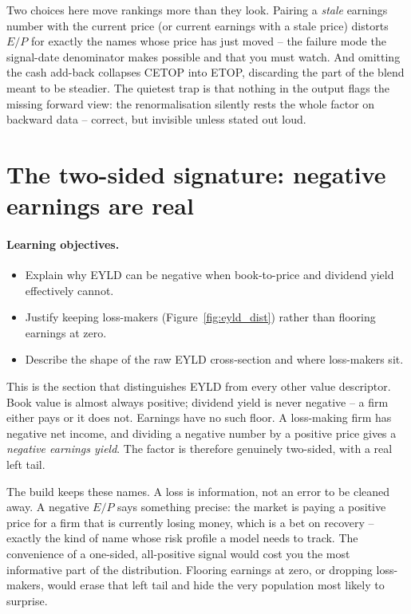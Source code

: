 \documentclass[11pt]{article}
\theoremstyle{definition}
\theoremstyle{plain}
\theoremstyle{remark}
\begin{document}
\begin{pitfall}
Two choices here move rankings more than they look. Pairing a \emph{stale} earnings number with the current price (or current earnings with a stale price) distorts $E/P$ for exactly the names whose price has just moved -- the failure mode the signal-date denominator makes possible and that you must watch. And omitting the cash add-back collapses CETOP into ETOP, discarding the part of the blend meant to be steadier. The quietest trap is that nothing in the output flags the missing forward view: the renormalisation silently rests the whole factor on backward data -- correct, but invisible unless stated out loud.
\end{pitfall}

\section{The two-sided signature: negative earnings are real}\label{sec:negative}

\paragraph{Learning objectives.}
\begin{itemize}[leftmargin=1.4em,topsep=2pt]
  \item Explain why EYLD can be negative when book-to-price and dividend yield effectively cannot.
  \item Justify keeping loss-makers (Figure~\ref{fig:eyld_dist}) rather than flooring earnings at zero.
  \item Describe the shape of the raw EYLD cross-section and where loss-makers sit.
\end{itemize}

This is the section that distinguishes EYLD from every other value descriptor. Book value is almost always positive; dividend yield is never negative -- a firm either pays or it does not. Earnings have no such floor. A loss-making firm has negative net income, and dividing a negative number by a positive price gives a \emph{negative earnings yield}. The factor is therefore genuinely two-sided, with a real left tail.

The build keeps these names. A loss is information, not an error to be cleaned away. A negative $E/P$ says something precise: the market is paying a positive price for a firm that is currently losing money, which is a bet on recovery -- exactly the kind of name whose risk profile a model needs to track. The convenience of a one-sided, all-positive signal would cost you the most informative part of the distribution. Flooring earnings at zero, or dropping loss-makers, would erase that left tail and hide the very population most likely to surprise.
\end{document}

